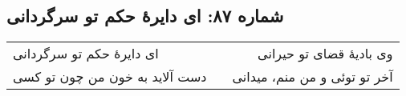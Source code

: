 \begin{center}
\section*{شماره ۸۷: ای دایرۀ حکم تو سرگردانی}
\label{sec:087}
\begin{longtable}{l p{0.5cm} r}
ای دایرهٔ حکم تو سرگردانی
&&
وی بادیهٔ قضای تو حیرانی
\\
دست آلاید به خون من چون تو کسی
&&
آخر تو توئی و من منم، میدانی
\\
\end{longtable}
\end{center}
